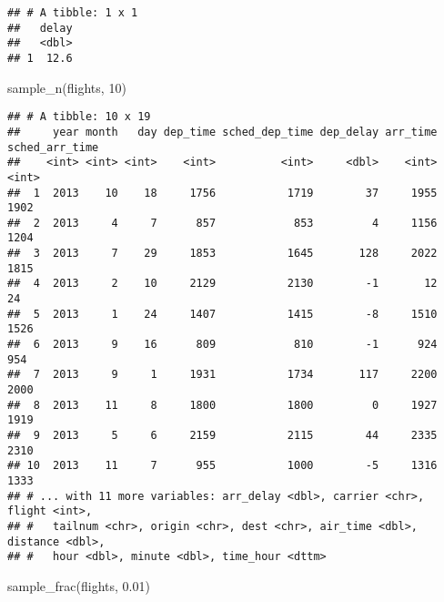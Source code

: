\documentclass[
]{article}
\newenvironment{Shaded}{\begin{snugshade}}{\end{snugshade}}
\newcommand{\DecValTok}[1]{\textcolor[rgb]{0.00,0.00,0.81}{#1}}
\newcommand{\FloatTok}[1]{\textcolor[rgb]{0.00,0.00,0.81}{#1}}
\newcommand{\FunctionTok}[1]{\textcolor[rgb]{0.00,0.00,0.00}{#1}}
\newcommand{\NormalTok}[1]{#1}
\begin{document}
\begin{verbatim}
## # A tibble: 1 x 1
##   delay
##   <dbl>
## 1  12.6
\end{verbatim}

\begin{Shaded}
\begin{Highlighting}[]
\FunctionTok{sample\_n}\NormalTok{(flights, }\DecValTok{10}\NormalTok{)}
\end{Highlighting}
\end{Shaded}

\begin{verbatim}
## # A tibble: 10 x 19
##     year month   day dep_time sched_dep_time dep_delay arr_time sched_arr_time
##    <int> <int> <int>    <int>          <int>     <dbl>    <int>          <int>
##  1  2013    10    18     1756           1719        37     1955           1902
##  2  2013     4     7      857            853         4     1156           1204
##  3  2013     7    29     1853           1645       128     2022           1815
##  4  2013     2    10     2129           2130        -1       12             24
##  5  2013     1    24     1407           1415        -8     1510           1526
##  6  2013     9    16      809            810        -1      924            954
##  7  2013     9     1     1931           1734       117     2200           2000
##  8  2013    11     8     1800           1800         0     1927           1919
##  9  2013     5     6     2159           2115        44     2335           2310
## 10  2013    11     7      955           1000        -5     1316           1333
## # ... with 11 more variables: arr_delay <dbl>, carrier <chr>, flight <int>,
## #   tailnum <chr>, origin <chr>, dest <chr>, air_time <dbl>, distance <dbl>,
## #   hour <dbl>, minute <dbl>, time_hour <dttm>
\end{verbatim}

\begin{Shaded}
\begin{Highlighting}[]
\FunctionTok{sample\_frac}\NormalTok{(flights, }\FloatTok{0.01}\NormalTok{)}
\end{Highlighting}
\end{Shaded}
\end{document}
